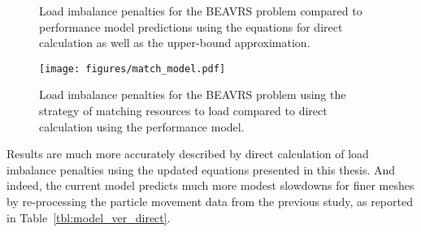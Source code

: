 \documentclass[12pt,twoside]{mitthesis-exec}
\begin{document}
\begin{figure}[p]
    \centering
    
    
    \caption{Load imbalance penalties for the BEAVRS problem compared to
    performance model predictions using the equations for direct calculation as
    well as the upper-bound approximation. \label{fig:model}}
\end{figure}

\begin{figure}[p]
    \centering
    \texttt{[image: figures/match\_model.pdf]}
    \caption[Model evaluation for process/load matching load balancing
    strategy]{Load imbalance penalties for the BEAVRS problem using the strategy
    of matching resources to load compared to direct calculation using the
    performance model.\label{fig:match_model}}
\end{figure}

Results are much more accurately described by direct calculation of load
imbalance penalties using the updated equations presented in this thesis. And
indeed, the current model predicts much more modest slowdowns for finer meshes
by re-processing the particle movement data from the previous study, as reported
in Table~\ref{tbl:model_ver_direct}.
\end{document}
